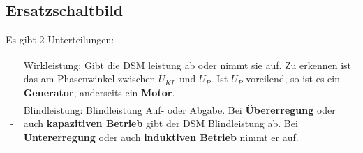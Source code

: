 	\subsection{Ersatzschaltbild}
		\begin{minipage}{11cm}
			Es gibt 2 Unterteilungen:\\
			\begin{tabular}{p{1cm} p{9cm}}
			    -& Wirkleistung: Gibt die DSM leistung ab oder nimmt sie auf. Zu erkennen
			    ist das am Phasenwinkel zwischen $U_{KL}$ und $U_P$. Ist $U_P$ voreilend, so ist
				es ein \textbf{Generator}, anderseits ein \textbf{Motor}.\\
				-& Blindleistung: Blindleistung Auf- oder Abgabe. Bei
				\textbf{Übererregung} oder auch \textbf{kapazitiven Betrieb} gibt der
				DSM Blindleistung ab. Bei \textbf{Untererregung} oder auch \textbf{induktiven Betrieb} nimmt er auf.\\
			\end{tabular}
	    \end{minipage}
		\begin{minipage}{8cm}
	    \end{minipage}\\
	
